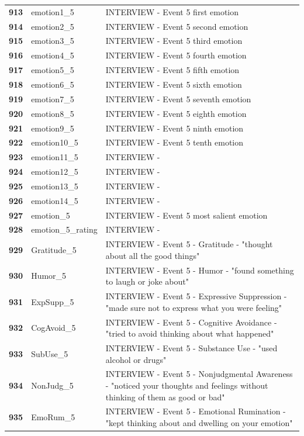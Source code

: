 \documentclass[
  letterpaper,
  DIV=11,
  numbers=noendperiod]{scrartcl}
\begin{document}
\begin{longtable}[t]{>{}cll}
\textbf{913} & emotion1\_5 & INTERVIEW - Event 5 first emotion\\
\textbf{914} & emotion2\_5 & INTERVIEW - Event 5 second emotion\\
\textbf{915} & emotion3\_5 & INTERVIEW - Event 5 third emotion\\
\addlinespace
\textbf{916} & emotion4\_5 & INTERVIEW - Event 5 fourth emotion\\
\textbf{917} & emotion5\_5 & INTERVIEW - Event 5 fifth emotion\\
\textbf{918} & emotion6\_5 & INTERVIEW - Event 5 sixth emotion\\
\textbf{919} & emotion7\_5 & INTERVIEW - Event 5 seventh emotion\\
\textbf{920} & emotion8\_5 & INTERVIEW - Event 5 eighth emotion\\
\addlinespace
\textbf{921} & emotion9\_5 & INTERVIEW - Event 5 ninth emotion\\
\textbf{922} & emotion10\_5 & INTERVIEW - Event 5 tenth emotion\\
\textbf{923} & emotion11\_5 & INTERVIEW -\\
\textbf{924} & emotion12\_5 & INTERVIEW -\\
\textbf{925} & emotion13\_5 & INTERVIEW -\\
\addlinespace
\textbf{926} & emotion14\_5 & INTERVIEW -\\
\textbf{927} & emotion\_5 & INTERVIEW - Event 5 most salient emotion\\
\textbf{928} & emotion\_5\_rating & INTERVIEW -\\
\textbf{929} & Gratitude\_5 & INTERVIEW - Event 5 - Gratitude - "thought about all the good things"\\
\textbf{930} & Humor\_5 & INTERVIEW - Event 5 - Humor - "found something to laugh or joke about"\\
\addlinespace
\textbf{931} & ExpSupp\_5 & INTERVIEW - Event 5 - Expressive Suppression - "made sure not to express what you were feeling"\\
\textbf{932} & CogAvoid\_5 & INTERVIEW - Event 5 - Cognitive Avoidance - "tried to avoid thinking about what happened"\\
\textbf{933} & SubUse\_5 & INTERVIEW - Event 5 - Substance Use - "used alcohol or drugs"\\
\textbf{934} & NonJudg\_5 & INTERVIEW - Event 5 - Nonjudgmental Awareness - "noticed your thoughts and feelings without thinking of them as good or bad"\\
\textbf{935} & EmoRum\_5 & INTERVIEW - Event 5 - Emotional Rumination - "kept thinking about and dwelling on your emotion"\\

\end{longtable}
\end{document}
